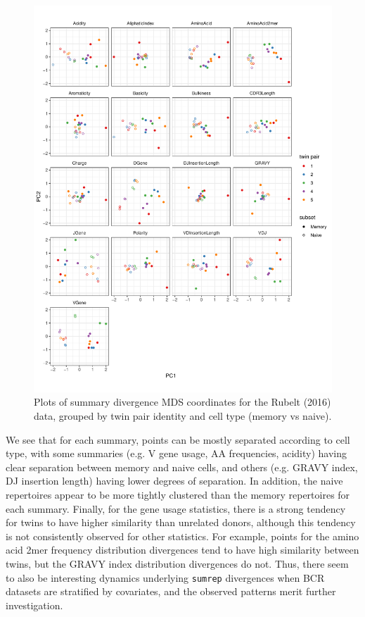 \documentclass{article}
\begin{document}
\begin{figure}
    \includegraphics[width=\linewidth]{Figures/bcr_pca.pdf}
    \caption{Plots of summary divergence MDS coordinates for the Rubelt (2016) data, grouped by twin pair identity and cell type (memory vs naive).}
    \label{fig:BCR_MDS}
\end{figure}
We see that for each summary, points can be mostly separated according to cell type, with some summaries (e.g. V gene usage, AA frequencies, acidity) having clear separation between memory and naive cells, and others (e.g. GRAVY index, DJ insertion length) having lower degrees of separation.
In addition, the naive repertoires appear to be more tightly clustered than the memory repertoires for each summary.
Finally, for the gene usage statistics, there is a strong tendency for twins to have higher similarity than unrelated donors, although this tendency is not consistently observed for other statistics.
For example, points for the amino acid 2mer frequency distribution divergences tend to have high similarity between twins, but the GRAVY index distribution divergences do not.
Thus, there seem to also be interesting dynamics underlying \texttt{sumrep} divergences when BCR datasets are stratified by covariates, and the observed patterns merit further investigation.
\end{document}
